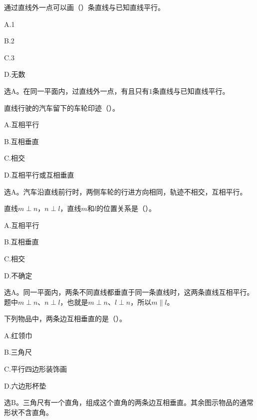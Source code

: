 通过直线外一点可以画（\hspace{1.8em}）条直线与已知直线平行。\par
\noindent A.1\par
\noindent B.2\par
\noindent C.3\par
\noindent D.无数\par
\begin{BookAnswer}
选\(\mathrm A\)。在同一平面内，过直线外一点，有且只有\(1\)条直线与已知直线平行。
\end{BookAnswer}

直线行驶的汽车留下的车轮印迹（\hspace{1.8em}）。\par
\noindent A.互相平行\par
\noindent B.互相垂直\par
\noindent C.相交\par
\noindent D.互相平行或互相垂直\par
\begin{BookAnswer}
选\(\mathrm A\)。汽车沿直线前行时，两侧车轮的行进方向相同，轨迹不相交，互相平行。
\end{BookAnswer}

直线\(m\perp n\)，\allowbreak{}\(n\perp l\)，直线\(m\)和\(l\)的位置关系是（\hspace{1.8em}）。\par
\noindent A.互相平行\par
\noindent B.互相垂直\par
\noindent C.相交\par
\noindent D.不确定\par
\begin{BookAnswer}
选\(\mathrm A\)。同一平面内，两条不同直线都垂直于同一条直线时，这两条直线互相平行。题中\(m\perp n\)、\(n\perp l\)，也就是\(m\perp n\)、\(l\perp n\)，所以\(m\parallel l\)。
\end{BookAnswer}

下列物品中，两条边互相垂直的是（\hspace{1.8em}）。\par
\noindent A.红领巾\par
\noindent B.三角尺\par
\noindent C.平行四边形装饰画\par
\noindent D.六边形杯垫\par
\begin{BookAnswer}
选\(\mathrm B\)。三角尺有一个直角，组成这个直角的两条边互相垂直。其余图示物品的通常形状不含直角。
\end{BookAnswer}

